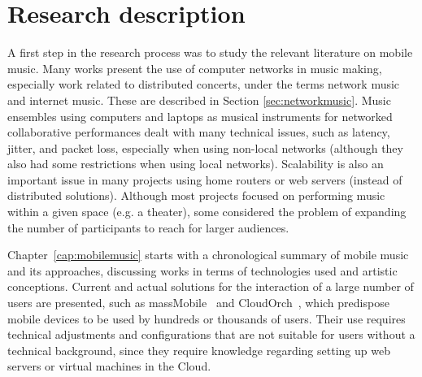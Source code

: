 \section{Research description}

A first step in the research process was to study the relevant literature on mobile music.
Many works present the use of computer networks in music making, especially work related to distributed concerts, under the terms network music and internet music.
These are described in Section \ref{sec:networkmusic}.
Music ensembles using computers and laptops as musical instruments for networked collaborative performances dealt with many technical issues, such as latency, jitter, and packet loss, especially when using non-local networks (although they also had some restrictions when using local networks).
Scalability is also an important issue in many projects using home routers or web servers (instead of distributed solutions).
Although most projects focused on performing music within a given space (e.g. a theater), some considered the problem of expanding the number of participants to reach for larger audiences.

Chapter~\ref{cap:mobilemusic} starts with a chronological summary of mobile music and its approaches, discussing
works in terms of technologies used and artistic conceptions.
Current and actual solutions for the interaction of a large number of users are presented, such as massMobile~\citep{Weitzner2012massmobile} and CloudOrch~\citep{Hindle2014cloudorch}, which predispose mobile devices to be used by hundreds or thousands of users.
Their use requires technical adjustments and configurations that are not suitable for users without a technical background, since they require knowledge regarding setting up web servers or virtual machines in the Cloud.

